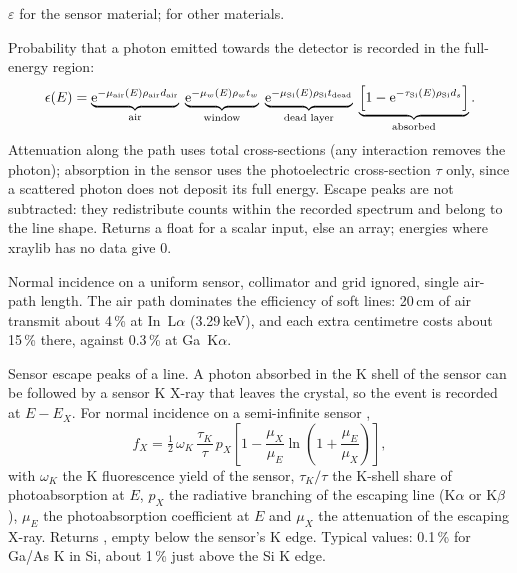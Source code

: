 $\varepsilon$ for the sensor material;  for other materials.

Probability that a photon emitted towards the detector is recorded in the full-energy
region:
\begin{equation}
  \epsilon(E) = \underbrace{\mathrm{e}^{-\mu_\mathrm{air}(E)\rho_\mathrm{air}d_\mathrm{air}}}_{\text{air}}\;
  \underbrace{\mathrm{e}^{-\mu_w(E)\rho_w t_w}}_{\text{window}}\;
  \underbrace{\mathrm{e}^{-\mu_\mathrm{Si}(E)\rho_\mathrm{Si}t_\mathrm{dead}}}_{\text{dead layer}}\;
  \underbrace{\left[1-\mathrm{e}^{-\tau_\mathrm{Si}(E)\rho_\mathrm{Si}d_s}\right]}_{\text{absorbed}} .
  \label{eq:efficiency}
\end{equation}
Attenuation along the path uses total cross-sections (any interaction removes the photon);
absorption in the sensor uses the photoelectric cross-section $\tau$ only, since a scattered
photon does not deposit its full energy. Escape peaks are not subtracted: they redistribute
counts within the recorded spectrum and belong to the line shape. Returns a float for a
scalar input, else an array; energies where xraylib has no data give 0.
\begin{hyp}
Normal incidence on a uniform sensor, collimator and grid ignored, single air-path length.
The air path dominates the efficiency of soft lines: 20\,cm of air transmit about 4\,\% at
In~L$\alpha$ (3.29\,keV), and each extra centimetre costs about 15\,\% there, against 0.3\,\%
at Ga~K$\alpha$.
\end{hyp}

Sensor escape peaks of a line. A photon absorbed in the K shell of the sensor can be followed
by a sensor K X-ray that leaves the crystal, so the event is recorded at $E-E_X$. For normal
incidence on a semi-infinite sensor \citep{ReedWare1972},
\begin{equation}
  f_X = \tfrac12\,\omega_K\,\frac{\tau_K}{\tau}\,p_X
  \left[1-\frac{\mu_X}{\mu_E}\ln\!\left(1+\frac{\mu_E}{\mu_X}\right)\right],
  \label{eq:escape}
\end{equation}
with $\omega_K$ the K fluorescence yield of the sensor, $\tau_K/\tau$ the K-shell share of
photoabsorption at $E$, $p_X$ the radiative branching of the escaping line (K$\alpha$ or
K$\beta$), $\mu_E$ the photoabsorption coefficient at $E$ and $\mu_X$ the attenuation of the
escaping X-ray. Returns , empty below the sensor's
K edge. Typical values: 0.1\,\% for Ga/As K in Si, about 1\,\% just above the Si K edge.

